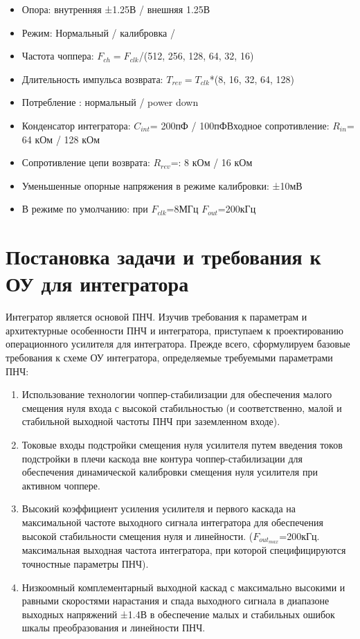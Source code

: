 \documentclass[a4paper,12pt,oneside]{scrartcl}
\begin{document}
\begin{itemize}
    \item Опора: внутренняя ±1.25В / {\color{green}внешняя 1.25В}
    \item Режим: Нормальный / калибровка /
    \item Частота чоппера: $F_{ch}= F_{clk}$/({\color{green}512}, 256, 128, 64, 32, 16)
    \item Длительность импульса возврата: $T_{rev}=T_{clk}$*(8, {\color{green}16}, 32, 64, 128)
    \item Потребление :  нормальный / {\color{green}power down}
    \item Конденсатор интегратора: $C_{int}$= 200пФ / 100пФВходное сопротивление: $R_{in}$= {\color{green}64 кОм} / 128 кОм
    \item Сопротивление цепи возврата: $R_{rev}$=: {\color{green}8 кОм} / 16 кОм
    \item Уменьшенные опорные напряжения в режиме калибровки: {\color{green}±10мВ}
    \item В режиме по умолчанию: при {\color{green}$F_{clk}$=8МГц $F_{out}$=200кГц}
\end{itemize}


\clearpage






\section{Постановка задачи и требования к ОУ для интегратора}


Интегратор является основой ПНЧ. Изучив требования к параметрам и архитектурные особенности ПНЧ и интегратора, приступаем к проектированию операционного усилителя для интегратора. Прежде всего, сформулируем базовые требования к схеме ОУ интегратора, определяемые требуемыми параметрами ПНЧ:

\begin{enumerate}
    \item Использование технологии чоппер-стабилизации для обеспечения малого смещения нуля входа с высокой стабильностью (и соответственно, малой и стабильной выходной частоты ПНЧ при заземленном входе).
	\item Токовые входы подстройки смещения нуля усилителя путем введения токов подстройки в плечи каскода вне контура чоппер-стабилизации для обеспечения динамической калибровки смещения нуля усилителя при активном чоппере.
	\item Высокий коэффициент усиления усилителя и первого каскада на максимальной частоте выходного сигнала интегратора для обеспечения высокой стабильности смещения нуля и линейности. ($F_{out_{max}}$=200кГц.   максимальная выходная частота интегратора, при которой специфицируются точностные параметры ПНЧ).
	\item Низкоомный комплементарный выходной каскад с максимально высокими и равными скоростями нарастания и спада выходного сигнала в диапазоне выходных напряжений ±1.4В в обеспечение малых и стабильных ошибок шкалы преобразования и линейности ПНЧ.
\end{enumerate}
\end{document}
